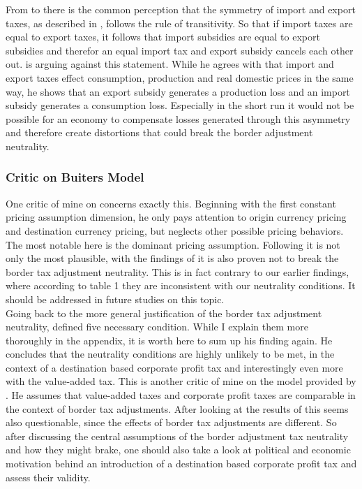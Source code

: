 From \cite{grossman1980border} to \cite{buiter2017exchange} there is the common perception that the symmetry of import and export taxes, as described in \cite{lerner1936symmetry}, follows the rule of transitivity. So that if import taxes are equal to export taxes, it follows that import subsidies are equal to export subsidies and therefor an equal import tax and export subsidy cancels each other out. \cite{casas1991lerner} is arguing against this statement. While he agrees with \cite{lerner1936symmetry} that import and export taxes effect consumption, production and real domestic prices in the same way, he shows that an export subsidy generates a production loss and an import subsidy generates a consumption loss. Especially in the short run it would not be possible for an economy to compensate losses generated through this asymmetry and therefore create distortions that could break the border adjustment neutrality. 

\subsubsection{Critic on Buiters Model}

One critic of mine on \cite{buiter2017exchange} concerns exactly this. Beginning with the first constant pricing assumption dimension, he only pays attention to origin currency pricing and destination currency pricing, but neglects other possible pricing behaviors. The most notable here is the dominant pricing assumption. Following \cite{casas2017dominant} it is not only the most plausible, with the findings of \cite{linde2017macroeconomic} it is also proven not to break the border tax adjustment neutrality. This is in fact contrary to our earlier findings, where according to table 1 they are inconsistent with our neutrality conditions. It should be addressed in future studies on this topic. ~\\
Going back to the more general justification of the border tax adjustment neutrality, \cite{barbiero2018macroeconomics} defined five necessary condition. While I explain them more thoroughly in the appendix, it is worth here to sum up his finding again. He concludes that the neutrality conditions are highly unlikely to be met, in the context of a destination based corporate profit tax and interestingly even more with the value-added tax. This is another critic of mine on the model provided by \cite{buiter2017exchange}. He assumes that value-added taxes and corporate profit taxes are comparable in the context of border tax adjustments. After looking at the results of \cite{barbiero2018macroeconomics} this seems also questionable, since the effects of border tax adjustments are different. So after discussing the central assumptions of the border adjustment tax neutrality and how they might brake, one should also take a look at political and economic motivation behind an introduction of a destination based corporate profit tax and assess their validity.


